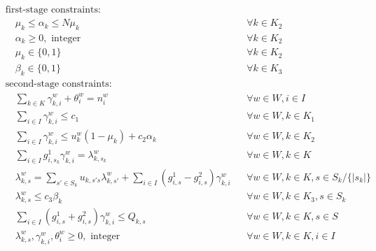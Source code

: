 \documentclass[10pt]{article}
\begin{document}
\begin{align*}
&\text{first-stage constraints:} \\
&\quad \mu_k \le \alpha_k \le N \mu_k && \forall k \in K_2 \tag{2} \\
&\quad \alpha_k \geq 0, \text{ integer} && \forall k \in K_2 \tag{3} \\
&\quad \mu_k \in \{0, 1\} && \forall k \in K_2 \tag{4} \\
&\quad \beta_k \in \{0, 1\} && \forall k \in K_3 \tag{5} \\
&\text{second-stage constraints:} \\
&\quad \sum_{k \in K} \gamma^w_{k,i} + \theta^w_i = n^w_i && \forall w \in W, i \in I \tag{7} \\
&\quad \sum_{i \in I} \gamma^w_{k,i} \le c_1 && \forall w \in W, k \in K_1 \tag{8} \\
&\quad \sum_{i \in I} \gamma^w_{k,i} \le u^w_k (1 - \mu_k) + c_2 \alpha_k && \forall w \in W, k \in K_2 \tag{9} \\
&\quad \sum_{i \in I} g^1_{i,s_k} \gamma^w_{k,i} = \lambda^w_{k,s_k} && \forall w \in W, k \in K \tag{10} \\
&\quad \lambda^w_{k,s} = \sum_{s' \in S_k} u_{k,s's} \lambda^w_{k,s'} + \sum_{i \in I} (g^1_{i,s} - g^2_{i,s}) \gamma^w_{k,i} && \forall w \in W, k \in K, s \in S_k / \{|s_k|\} \tag{11} \\
&\quad \lambda^w_{k,s} \le c_3 \beta_k && \forall w \in W, k \in K_3, s \in S_k \tag{12} \\
&\quad \sum_{i \in I} (g^1_{i,s} + g^2_{i,s}) \gamma^w_{k,i} \le Q_{k,s} && \forall w \in W, k \in K, s \in S \tag{13} \\
&\quad \lambda^w_{k,s}, \gamma^w_{k,i}, \theta^w_i \ge 0, \text{ integer} && \forall w \in W, k \in K, i \in I \tag{14}
\end{align*}
\end{document}
